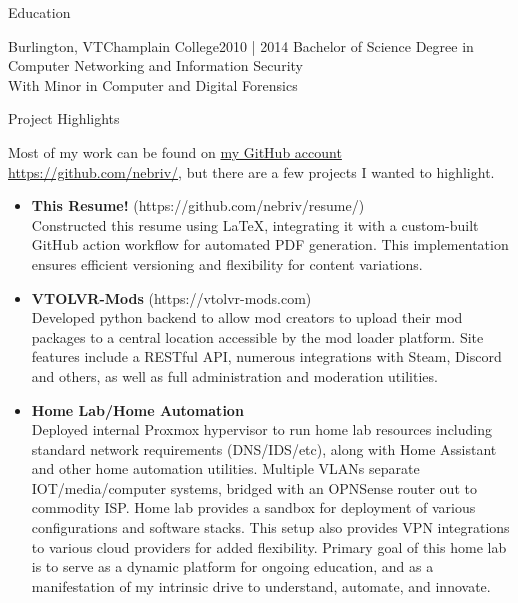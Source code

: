\documentclass[]{mcdowellcv}
\begin{document}
\begin{cvsection}{Education}
    \begin{cvsubsection}{Burlington, VT}{Champlain College}{2010 | 2014}
        \vspace{-1em}Bachelor of Science Degree in Computer Networking and Information Security\\
        \hspace*{1em}With Minor in Computer and Digital Forensics
    \end{cvsubsection}
\end{cvsection}

\begin{cvsection}{Project Highlights}
    \begin{cvsubsection}{}{}{}
        Most of my work can be found on \href{https://github.com/nebriv/}{my GitHub account https://github.com/nebriv/}, but there are a few projects I wanted to highlight.\\
        \begin{itemize}
            \setlength\itemsep{3pt}
            \item \textbf{This Resume!} (https://github.com/nebriv/resume/)
            \\Constructed this resume using LaTeX, integrating it with a custom-built GitHub action workflow for automated PDF generation. This implementation ensures efficient versioning and flexibility for content variations.
            \item \textbf{VTOLVR-Mods} (https://vtolvr-mods.com)
            \\Developed python backend to allow mod creators to upload their mod packages to a central location accessible by the mod loader platform. Site features include a RESTful API, numerous integrations with Steam, Discord and others, as well as full administration and moderation utilities.
            \item \textbf{Home Lab/Home Automation}
            \\Deployed internal Proxmox hypervisor to run home lab resources including standard network requirements (DNS/IDS/etc), along with Home Assistant and other home automation utilities. Multiple VLANs separate IOT/media/computer systems, bridged with an OPNSense router out to commodity ISP. Home lab provides a sandbox for deployment of various configurations and software stacks. This setup also provides VPN integrations to various cloud providers for added flexibility. Primary goal of this home lab is to serve as a dynamic platform for ongoing education, and as a manifestation of my intrinsic drive to understand, automate, and innovate.
        \end{itemize}
    \end{cvsubsection}
\end{cvsection}
\end{document}
